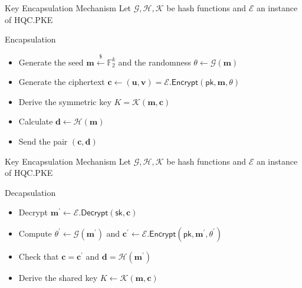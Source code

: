 \begin{frame}{Key Encapsulation Mechanism}
    Let $\mathcal{G, H, K}$ be hash functions and $\mathcal{E}$ an instance of \textsf{HQC.PKE}
    \begin{block}{Encapsulation}
        \begin{itemize}
            \item Generate the seed $\mathbf{m} \xleftarrow{\$} \mathds{F}_2^k$ and the randomness $\theta \leftarrow \mathcal{G}(\mathbf{m})$
            \item Generate the ciphertext $\mathbf{c} \leftarrow (\mathbf{u, v}) = \mathcal{E}.\textsf{Encrypt}(\textsf{pk}, \mathbf{m}, \theta)$
            \item Derive the symmetric key $K = \mathcal{K}(\mathbf{m, c})$
            \item Calculate $\mathbf{d} \leftarrow \mathcal{H}(\mathbf{m})$
            \item Send the pair $(\mathbf{c, d})$
        \end{itemize}
    \end{block}
\end{frame}

\begin{frame}{Key Encapsulation Mechanism}
    Let $\mathcal{G, H, K}$ be hash functions and $\mathcal{E}$ an instance of \textsf{HQC.PKE}
    \begin{block}{Decapsulation}
        \begin{itemize}
            \item Decrypt $\mathbf{m}^{'} \leftarrow \mathcal{E}.\textsf{Decrypt}(\textsf{sk}, \mathbf{c})$
            \item Compute $\theta^{'} \leftarrow \mathcal{G}(\mathbf{m}^{'})$ and $\mathbf{c}^{'} \leftarrow \mathcal{E}.\textsf{Encrypt}(\textsf{pk}, \mathbf{m}^{'}, \theta^{'})$
            \item Check that $\mathbf{c = c^{'}}$ and $\mathbf{d} = \mathcal{H}(\mathbf{m}^{'})$
            \item Derive the shared key $K \leftarrow \mathcal{K}(\mathbf{m, c})$
        \end{itemize}
    \end{block}
\end{frame}

